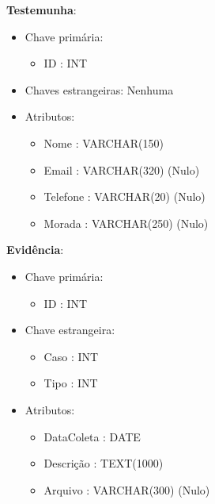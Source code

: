 \documentclass[a4paper,12pt]{scrreprt}
\begin{document}
        \vspace{0.5cm}

        \textbf{Testemunha}:
        \begin{itemize}
            \item Chave primária:
                \begin{itemize}
                    \item ID : INT
                \end{itemize}
            \item Chaves estrangeiras: Nenhuma
            \item Atributos:
                \begin{itemize}
                    \item Nome : VARCHAR(150)
                    \item Email : VARCHAR(320) (Nulo)
                    \item Telefone : VARCHAR(20) (Nulo)
                    \item Morada : VARCHAR(250) (Nulo)
                \end{itemize}
        \end{itemize}

        \clearpage

        \textbf{Evidência}:
        \begin{itemize}
            \item Chave primária:
                \begin{itemize}
                    \item ID : INT
                \end{itemize}
            \item Chave estrangeira:
                \begin{itemize}
                    \item Caso : INT
                    \item Tipo : INT
                \end{itemize}
            \item Atributos:
                \begin{itemize}
                    \item DataColeta : DATE
                    \item Descrição : TEXT(1000)
                    \item Arquivo : VARCHAR(300) (Nulo)
                \end{itemize}
        \end{itemize}
\end{document}
